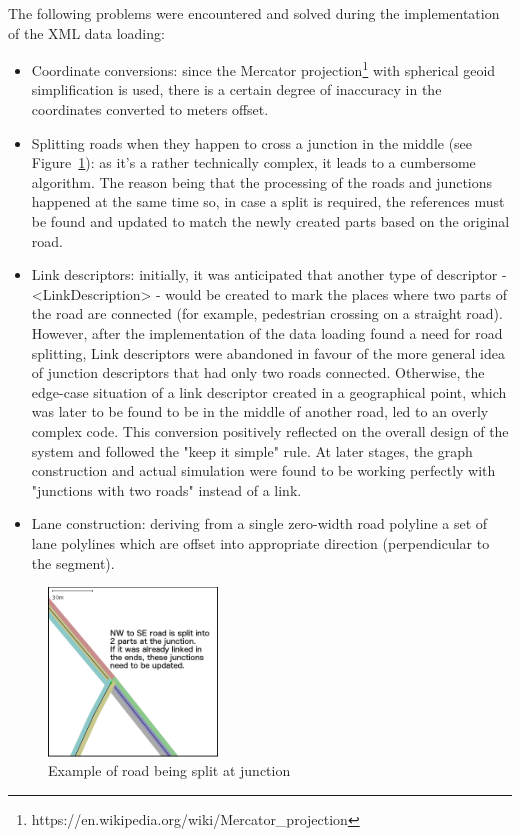 The following problems were encountered and solved during the implementation of the XML data loading:
\begin{itemize}
    \item Coordinate conversions: since the Mercator projection\footnote{https://en.wikipedia.org/wiki/Mercator\_projection} with spherical geoid simplification is used, there is a certain degree of inaccuracy in the coordinates converted to meters offset.
    \item Splitting roads when they happen to cross a junction in the middle (see Figure~\ref{fig:roadSplitting}): as it's a rather technically complex, it leads to a cumbersome algorithm. The reason being that the processing of the roads and junctions happened at the same time so, in case a split is required, the references must be found and updated to match the newly created parts based on the original road.
    \item Link descriptors: initially, it was anticipated that another type of descriptor - <LinkDescription> - would be created to mark the places where two parts of the road are connected (for example, pedestrian crossing on a straight road). However, after the implementation of the data loading found a need for road splitting, Link descriptors were abandoned in favour of the more general idea of junction descriptors that had only two roads connected. Otherwise, the edge-case situation of a link descriptor created in a geographical point, which was later to be found to be in the middle of another road, led to an overly complex code. This conversion positively reflected on the overall design of the system and followed the "keep it simple" rule. At later stages, the graph construction and actual simulation were found to be working perfectly with "junctions with two roads" instead of a link.
    \item Lane construction: deriving from a single zero-width road polyline a set of lane polylines which are offset into appropriate direction (perpendicular to the segment).
\end{itemize}

\begin{figure}[h]
    \vspace{1.5em}
	\caption{Example of road being split at junction}
	\label{fig:roadSplitting}
	\centering
	\includegraphics[width=0.4\textwidth]{figs/junction/road_splitting.png}
    \vspace{1.5em}
\end{figure}


